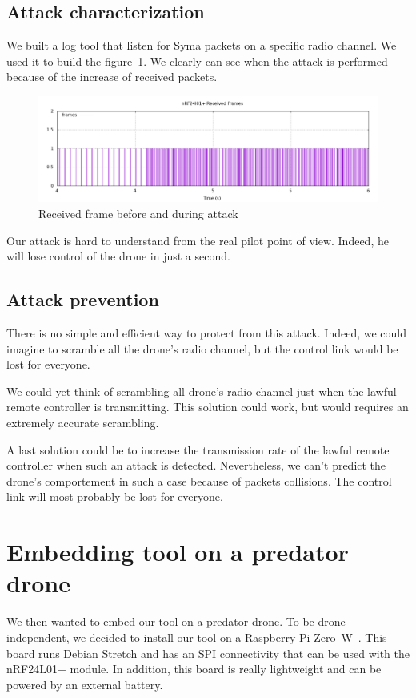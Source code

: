 \documentclass[conference,a4paper]{IEEEtran}
\begin{document}
\subsection{Attack characterization}
We built a log tool that listen for Syma packets on a specific radio channel. We used it
to build the figure~\ref{fig:syma}. We clearly can see when the attack is performed
because of the increase of received packets.

\begin{figure}[!hb]
  \centering
  \includegraphics[width=\linewidth]{../Rapport/img/gnuplot-trames-emises.png}
  \caption{Received frame before and during attack}%
  \label{fig:syma}
\end{figure}

Our attack is hard to understand from the real pilot point of view. Indeed, he will lose
control of the drone in just a second.

\subsection{Attack prevention}
There is no simple and efficient way to protect from this attack. Indeed, we could imagine
to scramble all the drone's radio channel, but the control link would be lost for
everyone.

We could yet think of scrambling all drone's radio channel just when the lawful remote
controller is transmitting. This solution could work, but would requires an extremely
accurate scrambling.

A last solution could be to increase the transmission rate of the lawful remote controller
when such an attack is detected. Nevertheless, we can't predict the drone's comportement
in such a case because of packets collisions. The control link will most probably be lost
for everyone.



\section{Embedding tool on a predator drone}
We then wanted to embed our tool on a predator drone. To be drone-independent, we decided
to install our tool on a Raspberry Pi Zero~W~\cite{bib:rpi0w}. This board runs Debian
Stretch and has an SPI connectivity that can be used with the nRF24L01+ module. In
addition, this board is really lightweight and can be powered by an external battery.
\end{document}
